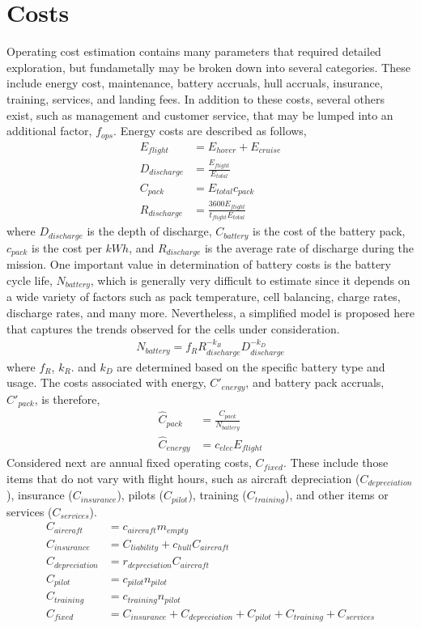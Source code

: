 \documentclass[12pt, letter]{article}
\begin{document}
\section{Costs}
Operating cost estimation contains many parameters that required detailed exploration, but fundametally may be broken down into several categories. These include energy cost, maintenance, battery accruals, hull accruals, insurance, training, services, and landing fees. In addition to these costs, several others exist, such as management and customer service, that may be lumped into an additional factor, $f_{ops}$. Energy costs are described as follows,
\begin{align}
	E_{flight}&=E_{hover}+E_{cruise} \\
	D_{discharge}&=\frac{E_{flight}}{E_{total}} \\
	C_{pack}&=E_{total} c_{pack}\\
	R_{discharge}&=\frac{3600 E_{flight}}{t_{flight} E_{total}}
\end{align}
where $D_{discharge}$ is the depth of discharge, $C_{battery}$ is the cost of the battery pack, $c_{pack}$ is the cost per $kWh$, and $R_{discharge}$ is the average rate of discharge during the mission. One important value in determination of battery costs is the battery cycle life, $N_{battery}$, which is generally very difficult to estimate since it depends on a wide variety of factors such as pack temperature, cell balancing, charge rates, discharge rates, and many more. Nevertheless, a simplified model is proposed here that captures the trends observed for the cells under consideration.
\begin{align}
	N_{battery}=f_R R_{discharge}^{-k_R} D_{discharge}^{-k_D}
\end{align}
where $f_R$, $k_R$. and $k_D$ are determined based on the specific battery type and usage. The costs associated with energy, $C'_{energy}$, and battery pack accruals, $C'_{pack}$, is therefore,
\begin{align}
	\hat{C}_{pack}&=\frac{C_{pack}}{N_{battery}} \\
	\hat{C}_{energy}&=c_{elec} E_{flight}
\end{align}
Considered next are annual fixed operating costs, $C_{fixed}$. These include those items that do not vary with flight hours, such as aircraft depreciation ($C_{depreciation}$), insurance ($C_{insurance}$), pilots ($C_{pilot}$), training ($C_{training}$), and other items or services ($C_{services}$).
\begin{align}
	C_{aircraft}&=c_{aircraft} m_{empty}\\
	C_{insurance}&=C_{liability}+c_{hull} C_{aircraft}\\
	C_{depreciation}&=r_{depreciation} C_{aircraft}\\
	C_{pilot}&=c_{pilot} n_{pilot}\\
	C_{training}&=c_{training} n_{pilot}\\
	C_{fixed}&=C_{insurance}+C_{depreciation}+C_{pilot}+C_{training}+C_{services}
\end{align}
\end{document}
